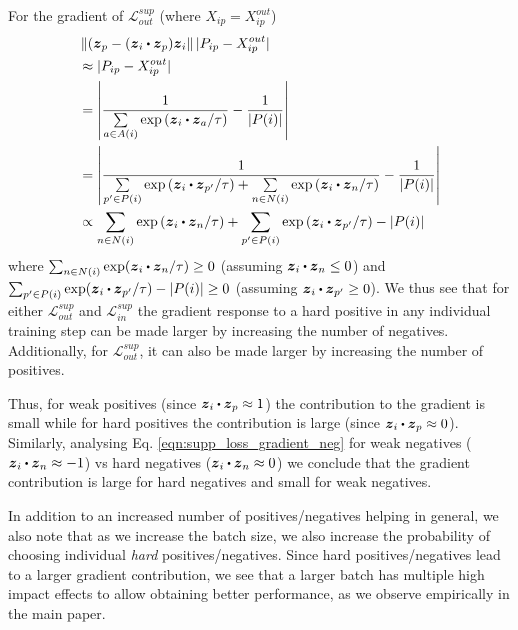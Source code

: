 For the gradient of $\mathcal{L}_{out}^{sup}$ (where $X_{ip}=X_{ip}^{out}$)
\begin{align}
  & \left\Vert(\boldsymbol{z}_p-(\boldsymbol{z}_i\bigcdot\boldsymbol{z}_p)\boldsymbol{z}_i\right\Vert|P_{ip}-X_{ip}^{out}|\nonumber\\
  & \approx |P_{ip}-X_{ip}^{out}|\nonumber\\
  & = \left|\frac{1}{\sum\limits_{a\in A(i)}\text{exp}\left(\boldsymbol{z}_i\bigcdot\boldsymbol{z}_a/\tau\right)}-\frac{1}{|P(i)|}\right|\nonumber\\
  & = \left|\frac{1}{\sum\limits_{p'\in P(i)}\text{exp}\left(\boldsymbol{z}_i\bigcdot\boldsymbol{z}_{p'}/\tau\right)+\sum\limits_{n\in N(i)}\text{exp}\left(\boldsymbol{z}_i\bigcdot\boldsymbol{z}_n/\tau\right)}-\frac{1}{|P(i)|}\right|\nonumber\\
  & \propto \sum_{n\in N(i)}\text{exp}\left(\boldsymbol{z}_i\bigcdot\boldsymbol{z}_n/\tau\right)+\sum_{p'\in P(i)}\text{exp}\left(\boldsymbol{z}_i\bigcdot\boldsymbol{z}_{p'}/\tau\right)-|P(i)|
  \label{eqn:supp_supcon_factor}
\end{align}
where $\sum_{n\in N(i)}\text{exp}(\boldsymbol{z}_i\bigcdot\boldsymbol{z}_n/\tau)\ge0$ (assuming $\boldsymbol{z}_i\bigcdot\boldsymbol{z}_n\le0$) and $\sum_{p'\in P(i)}\text{exp}(\boldsymbol{z}_i\bigcdot\boldsymbol{z}_{p'}/\tau)-|P(i)|\ge0$ (assuming $\boldsymbol{z}_i\bigcdot\boldsymbol{z}_{p'}\ge0$). We thus see that for either $\mathcal{L}_{out}^{sup}$ and $\mathcal{L}_{in}^{sup}$ the gradient response to a hard positive in any individual training step can be made larger by increasing the number of negatives. 
Additionally, for $\mathcal{L}_{out}^{sup}$, it can also be made larger by increasing the number of positives. 

Thus, for weak positives (since $\boldsymbol{z}_i\bigcdot\boldsymbol{z}_p\approx 1$) the contribution to the gradient is small while for hard positives the contribution is large (since $\boldsymbol{z}_i\bigcdot\boldsymbol{z}_p \approx 0$). Similarly, analysing Eq. \ref{eqn:supp_loss_gradient_neg} for weak negatives ($\boldsymbol{z}_i\bigcdot\boldsymbol{z}_n\approx -1$) vs hard negatives ($\boldsymbol{z}_i\bigcdot\boldsymbol{z}_n\approx 0$) we conclude that the gradient contribution is large for hard negatives and small for weak negatives.

In addition to an increased number of positives/negatives helping in general, we also note that as we increase the batch size, we also increase the probability of choosing individual \emph{hard} positives/negatives. Since hard positives/negatives lead to a larger gradient contribution, we see that a larger batch has multiple high impact effects to allow obtaining better performance, as we observe empirically in the main paper. %

